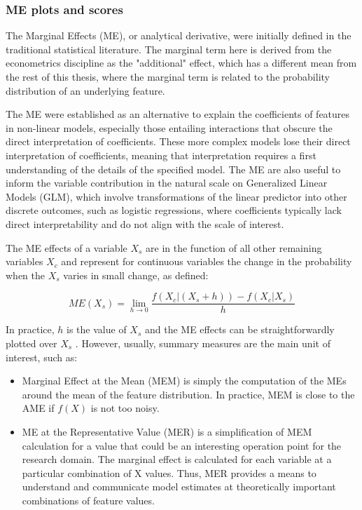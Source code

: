 \subsubsection{ME plots and scores}

The Marginal Effects (\gls{ME}), or analytical derivative, were initially defined in the traditional statistical literature. The marginal term here is derived from the econometrics discipline as the "additional" effect, which has a  different mean from the rest of this thesis, where the marginal term is related to the probability distribution of an underlying feature.

The \gls{ME} were established as an alternative to explain the coefficients of features in non-linear models, especially those entailing interactions that obscure the direct interpretation of coefficients. These more complex models lose their direct interpretation of coefficients, meaning that interpretation requires a first understanding of the details of the specified model\cite{Leeper2021InterpretingMargins, long1997regression}. The \gls{ME} are also useful to inform the variable contribution in the natural scale on Generalized Linear Models (GLM), which involve transformations of the linear predictor into other discrete outcomes, such as logistic regressions, where coefficients typically lack direct interpretability and do not align with the scale of interest.

The \gls{ME} effects of a variable $X_s$ are in the function of all other remaining variables $X_c$ and represent  for continuous variables the change in the probability when the $X_s$ varies in small change, as defined:

\begin{equation}
ME(X_s) = \lim_{{h \to 0}} \frac{{f(X_c|(X_s + h)) - f(X_c|X_s)}}{h}
\label{me}
\end{equation}

In practice, $h$ is the value of $X_s$ and the \gls{ME} effects can be straightforwardly plotted over $X_s$ . However, usually, summary measures are the main unit of interest, such as:

\begin{itemize}
    \item Marginal Effect at the Mean (MEM) is simply the computation of the \gls{ME}s around the mean of the feature distribution. In practice, MEM is close to the AME if \(f(X)\) is not too noisy.
\end{itemize}

\begin{itemize}
    \item ME at the Representative Value (MER) is a simpliﬁcation of MEM calculation for a value that could be an interesting operation point for the research domain. The marginal effect is calculated for each variable at a particular combination of X values. Thus, MER provides a means to understand and communicate model estimates at theoretically important combinations of feature values.
\end{itemize}

